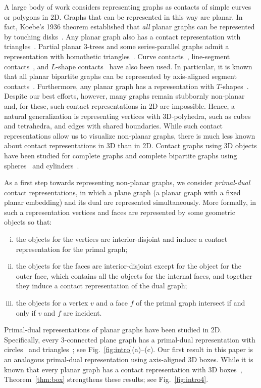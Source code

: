 \documentclass{article}
\newcommand{\df}{\textit}
\begin{document}
A large body of work considers representing graphs as contacts of
simple curves or polygons in 2D.
Graphs that can be represented in this way are planar.
In fact, Koebe's 1936 theorem established that \emph{all} planar
graphs can be represented by touching disks~\cite{Koe36}.
Any planar graph also has a contact representation with
triangles~\cite{FMR94,GLP12}. Partial planar $3$-trees and some
series-parallel graphs admit a representation with homothetic
triangles~\cite{BBGDF+07}. Curve contacts~\cite{Hli98}, line-segment
contacts~\cite{FM07a,KM94}, and $L$-shape contacts~\cite{CKU13,KUV13}
have also been used.
In particular, it is known that all planar bipartite graphs can be represented by axis-aligned
segment contacts~\cite{CKU98,FMP91,RT86}.
Furthermore, any planar graph has a representation with $T$-shapes~\cite{FMR94}.
Despite our best efforts, however, many graphs remain stubbornly
non-planar and, for these, such contact representations in 2D are impossible.
Hence, a natural generalization is representing vertices with 3D-polyhedra, such
as cubes and tetrahedra, and edges with shared boundaries. While such contact
representations allow us to visualize non-planar graphs, there is much less known
about contact representations in 3D than in 2D. Contact graphs using 3D objects
have been studied for complete graphs and complete bipartite graphs
using spheres~\cite{BR13,HK01} and cylinders~\cite{Bez05}.


As a first step towards representing non-planar graphs, we consider
\df{primal-dual} contact representations, in which a plane graph (a planar graph with a fixed planar embedding)
and its dual are represented simultaneously. More formally, in such a representation
vertices and faces are represented by some geometric objects so that:

\begin{enumerate}[(i)]
	\item the objects for the vertices are interior-disjoint and induce a contact representation
		for the primal graph;
	\item the objects for the faces are interior-disjoint except for the object for the outer
		face, which contains all the objects for the internal faces, and together they induce a
		contact representation of the dual graph;
	\item the objects for a vertex $v$ and a face $f$ of the primal graph intersect if and only
		if $v$ and $f$ are incident.
\end{enumerate}

Primal-dual representations of planar graphs have been studied in 2D. Specifically,
every $3$-connected plane graph has a primal-dual representation with circles~\cite{And70} and
triangles~\cite{GLP12}; see Fig.~\ref{fig:intro}(a)--(c). Our first result in this paper
is an analogous primal-dual representation using axis-aligned 3D boxes. While it is known that every planar graph has a contact representation with
3D boxes~\cite{Tho88,FF11,BEFHK+12},
 Theorem~\ref{thm:box} strengthens these results; see Fig.~\ref{fig:intro4}.
\end{document}
